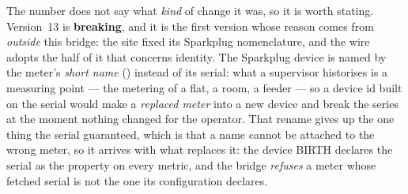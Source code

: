 The number does not say what \emph{kind} of change it was, so it is worth stating. Version~13
is \textbf{breaking}, and it is the first version whose reason comes from \emph{outside} this
bridge: the site fixed its Sparkplug nomenclature, and the wire adopts the half of it that concerns
identity. The Sparkplug device is named by the meter's \emph{short name} () instead of
its serial: what a supervisor historises is a measuring point --- the metering of a flat, a room, a
feeder --- so a device id built on the serial would make a \emph{replaced meter} into a new device
and break the series at the moment nothing changed for the operator. That rename gives up the one
thing the serial guaranteed, which is that a name cannot be attached to the wrong meter, so it
arrives with what replaces it: the device BIRTH declares the serial as the  property on
every metric, and the bridge \emph{refuses} a meter whose fetched serial is not the one its
configuration declares.


